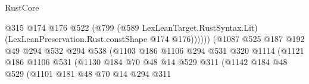 \begin{lexlean}{RustCore}
\begin{coremodule}
                                                  @315
                                                  @174
                                                  @176
                                                  @522
                                                  (@799
                                                    (@589 LexLeanTarget.RustSyntax.Lit)
                                                    (LexLeanPreservation.Rust.constShape
                                                      @174
                                                      @176))))))
                                          (@1087
                                            @525
                                            @187
                                            @192
                                            @49
                                            @294
                                            @532
                                            @294
                                            @538
                                            (@1103
                                              @186
                                              @1106
                                              @294
                                              @531
                                              @320
                                              @1114
                                              (@1121
                                                @186
                                                @1106
                                                @531
                                                (@1130
                                                  @184
                                                  @70
                                                  @48
                                                  @14
                                                  @529
                                                  @311
                                                  (@1142
                                                    @184
                                                    @48
                                                    @529
                                                    (@1101
                                                      @181
                                                      @48
                                                      @70
                                                      @14
                                                      @294
                                                      @311

\end{coremodule}
\end{lexlean}
